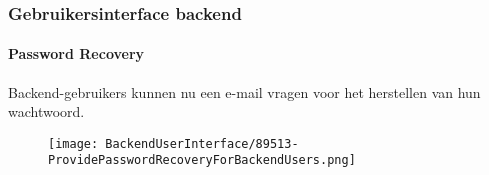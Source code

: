 
\begin{frame}[fragile]
	\frametitle{Gebruikersinterface backend}
	\framesubtitle{Password Recovery}

	Backend-gebruikers kunnen nu een e-mail vragen voor het herstellen van hun wachtwoord.

	\begin{figure}
		\texttt{[image: BackendUserInterface/89513-ProvidePasswordRecoveryForBackendUsers.png]}
	\end{figure}

\end{frame}

